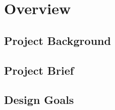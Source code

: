 \chapter{Overview}
\label{Chapter1}


\section{Project Background}


\section{Project Brief}


\section{Design Goals}

